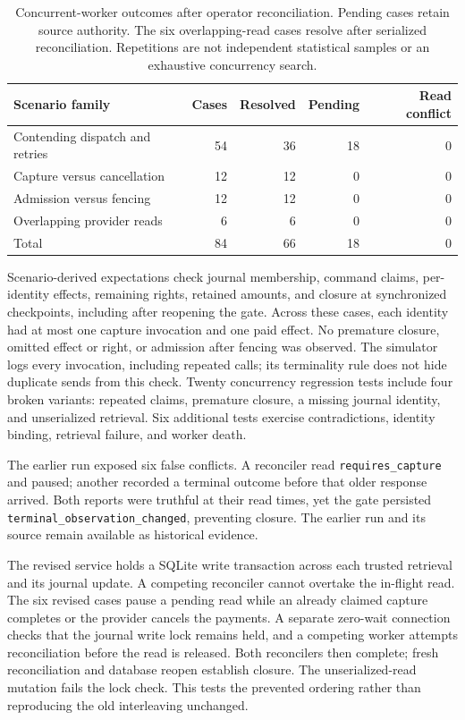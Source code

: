 \documentclass[11pt]{article}
\newcommand{\code}[1]{\texttt{\small #1}}
\begin{document}
\begin{table}[ht]
\centering\small
\begin{tabularx}{\linewidth}{@{}>{\raggedright\arraybackslash}X r r r r@{}}
\toprule
Scenario family & Cases & Resolved & Pending & Read conflict \\
\midrule
Contending dispatch and retries & 54 & 36 & 18 & 0 \\
Capture versus cancellation & 12 & 12 & 0 & 0 \\
Admission versus fencing & 12 & 12 & 0 & 0 \\
Overlapping provider reads & 6 & 6 & 0 & 0 \\
\midrule
Total & 84 & 66 & 18 & 0 \\
\bottomrule
\end{tabularx}
\caption{Concurrent-worker outcomes after operator reconciliation. Pending cases
retain source authority. The six overlapping-read cases resolve after serialized
reconciliation. Repetitions are not
independent statistical samples or an exhaustive concurrency search.}
\label{tab:concurrent}
\end{table}

Scenario-derived expectations check journal membership, command claims,
per-identity effects, remaining rights, retained amounts, and closure at
synchronized checkpoints, including after reopening the gate. Across these
cases, each identity had at most one capture invocation and one paid effect.
No premature closure, omitted effect or right, or admission after fencing was
observed. The simulator logs every invocation, including repeated calls; its
terminality rule does not hide duplicate sends from this check. Twenty concurrency
regression tests include four broken variants: repeated claims, premature closure,
a missing journal identity, and unserialized retrieval. Six additional tests
exercise contradictions, identity binding, retrieval failure, and worker death.

The earlier run exposed six false conflicts. A reconciler read
\code{requires\_capture} and paused; another recorded a terminal outcome before
that older response arrived. Both reports were truthful at their read times,
yet the gate persisted \code{terminal\_observation\_changed}, preventing closure.
The earlier run and its source remain available as historical evidence.

The revised service holds a SQLite write transaction across each trusted
retrieval and its journal update. A competing reconciler cannot overtake the
in-flight read. The six revised cases pause a pending read while an already
claimed capture completes or the provider cancels the payments. A separate
zero-wait connection checks that the journal write lock remains held, and a
competing worker attempts reconciliation before the read is released. Both
reconcilers then complete; fresh reconciliation and database reopen establish
closure. The unserialized-read mutation fails the lock check. This tests the
prevented ordering rather than reproducing the old interleaving unchanged.
\end{document}

